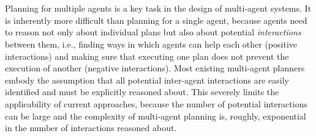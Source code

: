 \documentclass[11pt]{article}
\newcommand{\subtitle}[1]{%
  \posttitle{%
    \par\end{center}
    \begin{center}\large#1\end{center}
    \vskip0.5em}%
}
\begin{document}

\\
\vspace{0.25cm}
\\
\vspace{0.25cm}





Planning for multiple agents is a key task in the design of multi-agent systems. It is inherently more difficult than planning for a single agent, because agents need to reason not only about individual plans but also about potential {\em interactions} between them, i.e., finding ways in which agents can help each other (positive interactions) and making sure that executing one plan does not prevent the execution of another (negative interactions). Most existing multi-agent planners embody the assumption that all potential inter-agent interactions are easily identified and must be explicitly reasoned about. This severely limits the applicability of current approaches, because the number of potential interactions can be large and the complexity of multi-agent planning is, roughly, exponential in the number of interactions reasoned about. 
\end{document}
